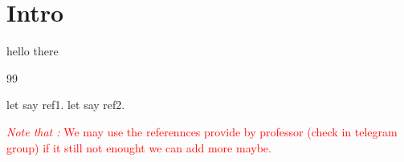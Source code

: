 \documentclass[12pt,a4paper]{report}
\begin{document}
% 

\section{Intro}
hello there
\clearpage
\renewcommand{\chapter}{\section}
\renewcommand{\thechapter}{} %
\renewcommand{\bibname}{References}  %
\begin{thebibliography}{99}
 let say ref1.
let say ref2.
\end{thebibliography}

\noindent \textcolor{red}{\textit{Note that :} We may use the referennces provide by professor (check in telegram group) if it still not enought we can add more maybe.}
\end{document}
